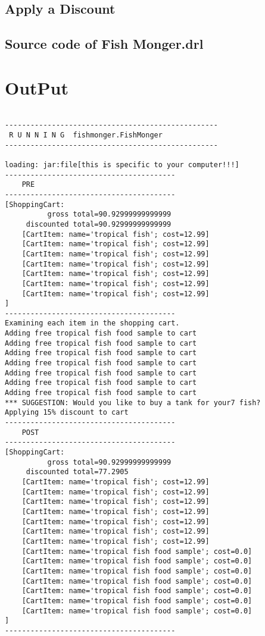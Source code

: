 \subsection{Apply a Discount}
\clearpage
\subsection{Source code of Fish Monger.drl}






\cleardoublepage
\section {OutPut}
\begin{lstlisting}

--------------------------------------------------
 R U N N I N G  fishmonger.FishMonger
--------------------------------------------------

loading: jar:file[this is specific to your computer!!!]
----------------------------------------
    PRE
----------------------------------------
[ShoppingCart:
	      gross total=90.92999999999999
	 discounted total=90.92999999999999
	[CartItem: name='tropical fish'; cost=12.99]
	[CartItem: name='tropical fish'; cost=12.99]
	[CartItem: name='tropical fish'; cost=12.99]
	[CartItem: name='tropical fish'; cost=12.99]
	[CartItem: name='tropical fish'; cost=12.99]
	[CartItem: name='tropical fish'; cost=12.99]
	[CartItem: name='tropical fish'; cost=12.99]
]
----------------------------------------
Examining each item in the shopping cart.
Adding free tropical fish food sample to cart
Adding free tropical fish food sample to cart
Adding free tropical fish food sample to cart
Adding free tropical fish food sample to cart
Adding free tropical fish food sample to cart
Adding free tropical fish food sample to cart
Adding free tropical fish food sample to cart
*** SUGGESTION: Would you like to buy a tank for your7 fish?
Applying 15% discount to cart
----------------------------------------
    POST
----------------------------------------
[ShoppingCart:
	      gross total=90.92999999999999
	 discounted total=77.2905
	[CartItem: name='tropical fish'; cost=12.99]
	[CartItem: name='tropical fish'; cost=12.99]
	[CartItem: name='tropical fish'; cost=12.99]
	[CartItem: name='tropical fish'; cost=12.99]
	[CartItem: name='tropical fish'; cost=12.99]
	[CartItem: name='tropical fish'; cost=12.99]
	[CartItem: name='tropical fish'; cost=12.99]
	[CartItem: name='tropical fish food sample'; cost=0.0]
	[CartItem: name='tropical fish food sample'; cost=0.0]
	[CartItem: name='tropical fish food sample'; cost=0.0]
	[CartItem: name='tropical fish food sample'; cost=0.0]
	[CartItem: name='tropical fish food sample'; cost=0.0]
	[CartItem: name='tropical fish food sample'; cost=0.0]
	[CartItem: name='tropical fish food sample'; cost=0.0]
]
----------------------------------------
\end{lstlisting}

